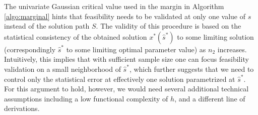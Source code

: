 \documentclass[mnsc,blindrev]{informs4} %
\newcommand{\R}{\mathbb{R}}
\begin{document}

 The univariate Gaussian critical value used in the margin in Algorithm \ref{algo:marginal} hints that feasibility needs to be validated at only one value of $s$ instead of the solution path $S$. The validity of this procedure is based on the statistical consistency of the obtained solution $x^*(\hat s^*)$ to some limiting solution (correspondingly $\hat s^*$ to some limiting optimal parameter value) as $n_2$ increases. Intuitively, this implies that with sufficient sample size one can focus feasibility validation on a small neighborhood of $\hat s^*$, which further suggests that we need to control only the statistical error at effectively one solution parametrized at $\hat s^*$. For this argument to hold, however, we would need several additional technical assumptions including a low functional complexity of $h$, and a different line of derivations.



\end{document}
